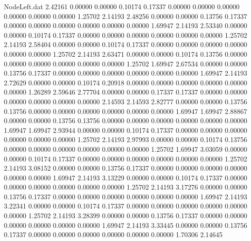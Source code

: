 \begin{filecontents}{NodeLeft.dat}
   2.42161    0.00000    0.00000     0.10174    0.17337    0.00000    0.00000    0.00000    0.00000    0.00000    0.00000    1.25702    2.14193
   2.48256    0.00000    0.00000     0.13756    0.17337    0.00000    0.00000    0.00000    0.00000    0.00000    0.00000    1.69947    2.14193
   2.53340    0.00000    0.00000     0.10174    0.17337    0.00000    0.00000    0.00000    0.00000    0.00000    0.00000    1.25702    2.14193
   2.58404    0.00000    0.00000     0.10174    0.17337    0.00000    0.00000    0.00000    0.00000    0.00000    0.00000    1.25702    2.14193
   2.63471    0.00000    0.00000     0.10174    0.13756    0.00000    0.00000    0.00000    0.00000    0.00000    0.00000    1.25702    1.69947
   2.67534    0.00000    0.00000     0.13756    0.17337    0.00000    0.00000    0.00000    0.00000    0.00000    0.00000    1.69947    2.14193
   2.72629    0.00000    0.00000     0.10174    0.20918    0.00000    0.00000    0.00000    0.00000    0.00000    0.00000    1.26289    2.59646
   2.77704    0.00000    0.00000     0.17337    0.17337    0.00000    0.00000    0.00000    0.00000    0.00000    0.00000    2.14593    2.14593
   2.82777    0.00000    0.00000     0.13756    0.13756    0.00000    0.00000    0.00000    0.00000    0.00000    0.00000    1.69947    1.69947
   2.88867    0.00000    0.00000     0.13756    0.13756    0.00000    0.00000    0.00000    0.00000    0.00000    0.00000    1.69947    1.69947
   2.93944    0.00000    0.00000     0.10174    0.17337    0.00000    0.00000    0.00000    0.00000    0.00000    0.00000    1.25702    2.14193
   2.97993    0.00000    0.00000     0.10174    0.13756    0.00000    0.00000    0.00000    0.00000    0.00000    0.00000    1.25702    1.69947
   3.03059    0.00000    0.00000     0.10174    0.17337    0.00000    0.00000    0.00000    0.00000    0.00000    0.00000    1.25702    2.14193
   3.08152    0.00000    0.00000     0.13756    0.17337    0.00000    0.00000    0.00000    0.00000    0.00000    0.00000    1.69947    2.14193
   3.13229    0.00000    0.00000     0.10174    0.17337    0.00000    0.00000    0.00000    0.00000    0.00000    0.00000    1.25702    2.14193
   3.17276    0.00000    0.00000     0.13756    0.17337    0.00000    0.00000    0.00000    0.00000    0.00000    0.00000    1.69947    2.14193
   3.22341    0.00000    0.00000     0.10174    0.17337    0.00000    0.00000    0.00000    0.00000    0.00000    0.00000    1.25702    2.14193
   3.28399    0.00000    0.00000     0.13756    0.17337    0.00000    0.00000    0.00000    0.00000    0.00000    0.00000    1.69947    2.14193
   3.33445    0.00000    0.00000     0.13756    0.17337    0.00000    0.00000    0.00000    0.00000    0.00000    0.00000    1.70306    2.14645

\end{filecontents}
